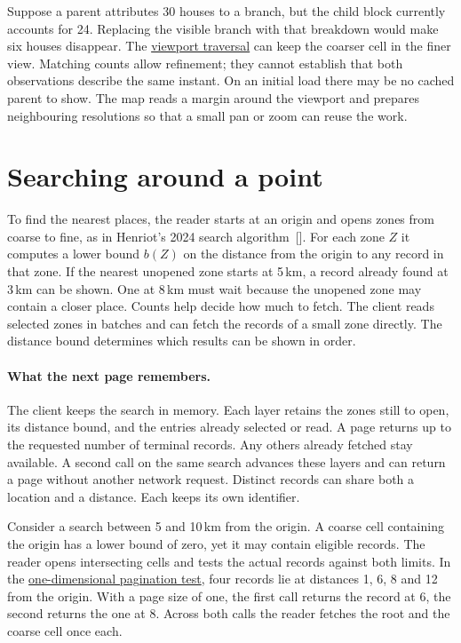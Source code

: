 \documentclass[11pt]{article}
\begin{document}
Suppose a parent attributes 30 houses to a branch, but the child block currently accounts for 24. Replacing the visible branch with that breakdown would make six houses disappear. The \href{https://github.com/indexus/sdk/blob/6e1bba2/src/walk/index.js}{viewport traversal} can keep the coarser cell in the finer view. Matching counts allow refinement; they cannot establish that both observations describe the same instant. On an initial load there may be no cached parent to show. The map reads a margin around the viewport and prepares neighbouring resolutions so that a small pan or zoom can reuse the work.

\section{Searching around a point}
To find the nearest places, the reader starts at an origin and opens zones from coarse to fine, as in Henriot's 2024 search algorithm~[]. For each zone $Z$ it computes a lower bound $b(Z)$ on the distance from the origin to any record in that zone. If the nearest unopened zone starts at 5\,km, a record already found at 3\,km can be shown. One at 8\,km must wait because the unopened zone may contain a closer place. Counts help decide how much to fetch. The client reads selected zones in batches and can fetch the records of a small zone directly. The distance bound determines which results can be shown in order.

\paragraph{What the next page remembers.}
The client keeps the search in memory. Each layer retains the zones still to open, its distance bound, and the entries already selected or read. A page returns up to the requested number of terminal records. Any others already fetched stay available. A second call on the same search advances these layers and can return a page without another network request. Distinct records can share both a location and a distance. Each keeps its own identifier.

Consider a search between 5 and 10\,km from the origin. A coarse cell containing the origin has a lower bound of zero, yet it may contain eligible records. The reader opens intersecting cells and tests the actual records against both limits. In the \href{https://github.com/indexus/sdk/blob/6e1bba2/src/local/annular-filter.test.mjs}{one-dimensional pagination test}, four records lie at distances 1, 6, 8 and 12 from the origin. With a page size of one, the first call returns the record at 6, the second returns the one at 8. Across both calls the reader fetches the root and the coarse cell once each.
\end{document}
